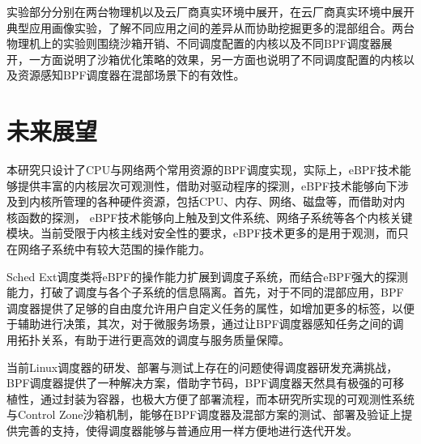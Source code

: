 实验部分分别在两台物理机以及云厂商真实环境中展开，在云厂商真实环境中展开典型应用画像实验，了解不同应用之间的差异从而协助挖掘更多的混部组合。两台物理机上的实验则围绕沙箱开销、不同调度配置的内核以及不同BPF调度器展开，一方面说明了沙箱优化策略的效果，另一方面也说明了不同调度配置的内核以及资源感知BPF调度器在混部场景下的有效性。

\section{未来展望}

本研究只设计了CPU与网络两个常用资源的BPF调度实现，实际上，eBPF技术能够提供丰富的内核层次可观测性，借助对驱动程序的探测，eBPF技术能够向下涉及到内核所管理的各种硬件资源，包括CPU、内存、网络、磁盘等，而借助对内核函数的探测， eBPF技术能够向上触及到文件系统、网络子系统等各个内核关键模块。当前受限于内核主线对安全性的要求，eBPF技术更多的是用于观测，而只在网络子系统中有较大范围的操作能力。

Sched Ext调度类将eBPF的操作能力扩展到调度子系统，而结合eBPF强大的探测能力，打破了调度与各个子系统的信息隔离。首先，对于不同的混部应用，BPF调度器提供了足够的自由度允许用户自定义任务的属性，如增加更多的标签，以便于辅助进行决策，其次，对于微服务场景，通过让BPF调度器感知任务之间的调用拓扑关系，有助于进行更高效的调度与服务质量保障。

当前Linux调度器的研发、部署与测试上存在的问题使得调度器研发充满挑战，BPF调度器提供了一种解决方案，借助字节码，BPF调度器天然具有极强的可移植性，通过封装为容器，也极大方便了部署流程，而本研究所实现的可观测性系统与Control Zone沙箱机制，能够在BPF调度器及混部方案的测试、部署及验证上提供完善的支持，使得调度器能够与普通应用一样方便地进行迭代开发。